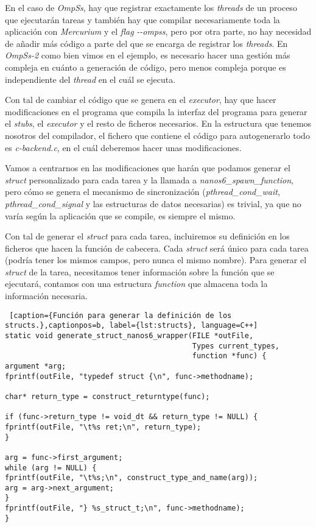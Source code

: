 En el caso de \textit{OmpSs}, hay que registrar exactamente los \textit{threads} de un proceso que ejecutarán tareas y también hay que compilar necesariamente toda la aplicación con \textit{Mercurium} y el \textit{flag} \textit{-{}-ompss}, pero por otra parte, no hay necesidad de añadir más código a parte del que se encarga de registrar los \textit{threads}. En \textit{OmpSs-2} como bien vimos en el ejemplo, es necesario hacer una gestión más compleja en cuánto a generación de código, pero menos compleja porque es independiente del \textit{thread} en el cuál se ejecuta.
\par\bigskip
Con tal de cambiar el código que se genera en el \textit{executor}, hay que hacer modificaciones en el programa que compila la interfaz del programa para generar el \textit{stubs}, el \textit{executor} y el resto de ficheros necesarios. En la estructura que tenemos nosotros del compilador, el fichero que contiene el código para autogenerarlo todo es \textit{c-backend.c}, en el cuál deberemos hacer unas modificaciones.
\par\smallskip
Vamos a centrarnos en las modificaciones que harán que podamos generar el \textit{struct} personalizado para cada tarea y la llamada a \textit{nanos6\_spawn\_function}, pero cómo se genera el mecanismo de sincronización (\textit{pthread\_cond\_wait}, \textit{pthread\_cond\_signal} y las estructuras de datos necesarias) es trivial, ya que no varía según la aplicación que se compile, es siempre el mismo.
\par\bigskip
Con tal de generar el \textit{struct} para cada tarea, incluiremos su definición en los ficheros que hacen la función de cabecera. Cada \textit{struct} será único para cada tarea (podría tener los mismos campos, pero nunca el mismo nombre). Para generar el \textit{struct} de la tarea, necesitamos tener información sobre la función que se ejecutará, contamos con una estructura \textit{function} que almacena toda la información necesaria.

\smallskip
\begin{lstlisting} [caption={Función para generar la definición de los structs.},captionpos=b, label={lst:structs}, language=C++]
static void generate_struct_nanos6_wrapper(FILE *outFile, 
										   Types current_types,
										   function *func) {
argument *arg;
fprintf(outFile, "typedef struct {\n", func->methodname);

char* return_type = construct_returntype(func);

if (func->return_type != void_dt && return_type != NULL) {
fprintf(outFile, "\t%s ret;\n", return_type);
}

arg = func->first_argument;
while (arg != NULL) {
fprintf(outFile, "\t%s;\n", construct_type_and_name(arg));
arg = arg->next_argument;
}
fprintf(outFile, "} %s_struct_t;\n", func->methodname);
}
\end{lstlisting}
\smallskip

